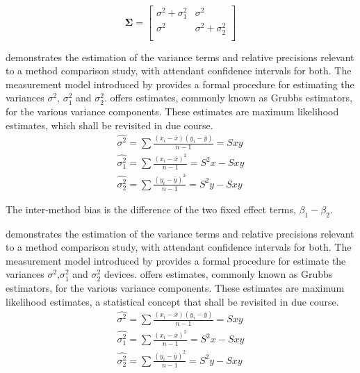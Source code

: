 \documentclass[12pt, a4paper]{report}
\theoremstyle{plain}
\theoremstyle{definition}
\theoremstyle{remark}
\begin{document}
	\[
	\boldsymbol{\Sigma} = \left[
	\begin{array}{cc}
	\sigma^{2} + \sigma^{2}_{1} & \sigma^{2} \\
	\sigma^{2} & \sigma^{2} + \sigma^{2}_{2} \\
	\end{array}
	\right]
	\] 
	
	\citet{Kinsella} demonstrates the estimation of the variance terms and relative precisions relevant to a method comparison study, with attendant confidence intervals for both. The measurement model introduced by \citet{Grubbs48,Grubbs73} provides a formal procedure for estimating the variances $\sigma^2$, $\sigma^2_{1}$ and $\sigma^2_{2}$. \citet{Grubbs48} offers estimates, commonly known as Grubbs estimators, for the various variance components. These estimates are maximum likelihood estimates, which shall be revisited in due course.
	\begin{eqnarray*}
		\hat{\sigma^{2}} = \sum{\frac{(x_{i}-\bar{x})(y_{i}-\bar{y})}{n-1}} = Sxy\\
		\hat{\sigma^{2}_{1}} = \sum{\frac{(x_{i}-\bar{x})^{2}}{n-1}} =S^{2}x - Sxy  \\
		\hat{\sigma^{2}_{2}} =
		\sum{\frac{(y_{i}-\bar{y})^{2}}{n-1}} = S^{2}y - Sxy
	\end{eqnarray*}
	
	
		The inter-method bias is the difference of the two fixed effect terms, $\beta_{1}-\beta_{2}$.
		
		\citet{Kinsella} demonstrates the estimation of the variance terms and relative precisions relevant to a method comparison study, with attendant confidence intervals for both. The measurement model introduced by \citet{Grubbs48,Grubbs73} provides a formal procedure for estimate the variances $\sigma^2$,$\sigma^2_{1}$ and $\sigma^2_{2}$ devices. \citet{Grubbs48} offers estimates, commonly known as Grubbs estimators, for the various variance components. These estimates are maximum likelihood estimates, a statistical concept that shall be revisited in due course.
		\begin{eqnarray*}
			\hat{\sigma^{2}} = \sum{\frac{(x_{i}-\bar{x})(y_{i}-\bar{y})}{n-1}} = Sxy\\
			\hat{\sigma^{2}_{1}} = \sum{\frac{(x_{i}-\bar{x})^{2}}{n-1}} =S^{2}x - Sxy  \\
			\hat{\sigma^{2}_{2}} =
			\sum{\frac{(y_{i}-\bar{y})^{2}}{n-1}} = S^{2}y - Sxy
		\end{eqnarray*}
		
\end{document}
